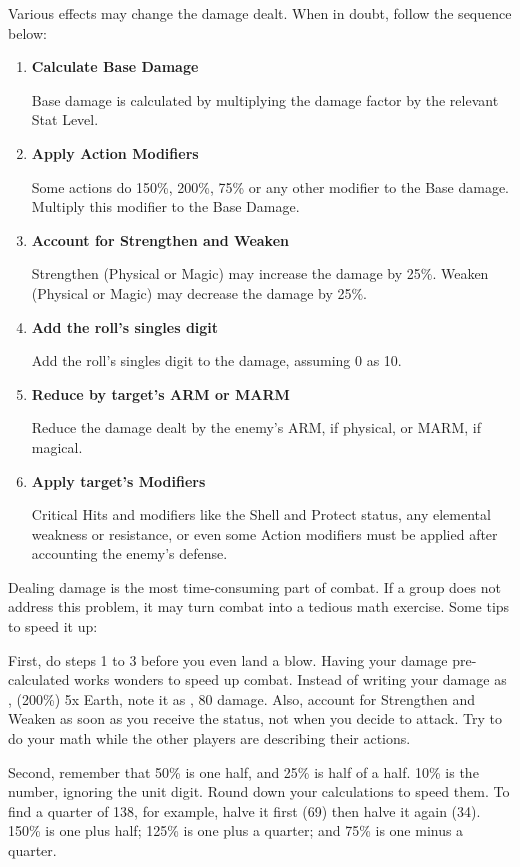 \begin{multicols}{2}
Various effects may change the damage dealt. When in doubt, follow the sequence below:
\begin{enumerate}
\item \textbf{Calculate Base Damage}

Base damage is calculated by multiplying the damage factor by the relevant Stat Level.

\item \textbf{Apply Action Modifiers}

Some actions do 150\%, 200\%, 75\% or any other modifier to the Base damage. Multiply this modifier to the Base Damage.

\item \textbf{Account for Strengthen and Weaken}

Strengthen (Physical or Magic) may increase the damage by 25\%. Weaken (Physical or Magic) may decrease the damage by 25\%.

\item \textbf{Add the roll's singles digit}

Add the roll's singles digit to the damage, assuming 0 as 10.

\item \textbf{Reduce by target's ARM or MARM}

Reduce the damage dealt by the enemy's ARM, if physical, or MARM, if magical.

\item \textbf{Apply target's Modifiers}

Critical Hits and modifiers like the Shell and Protect status, any elemental weakness or resistance, or even some Action modifiers must be applied after accounting the enemy's defense.
\end{enumerate}

\begin{boco}
Dealing damage is the most time-consuming part of combat. If a group does not address this problem, it may turn combat into a tedious math exercise. Some tips to speed it up:

First, do steps 1 to 3 before you even land a blow. Having your damage pre-calculated works wonders to speed up combat. Instead of writing your damage as , (200\%) 5x Earth, note it as , 80 damage. Also, account for Strengthen and Weaken as soon as you receive the status, not when you decide to attack. Try to do your math while the other players are describing their actions.

Second, remember that 50\% is one half, and 25\% is half of a half. 10\% is the number, ignoring the unit digit. Round down your calculations to speed them. To find a quarter of 138, for example, halve it first (69) then halve it again (34). 150\% is one plus half; 125\% is one plus a quarter; and 75\% is one minus a quarter.


\end{boco}
\end{multicols}
